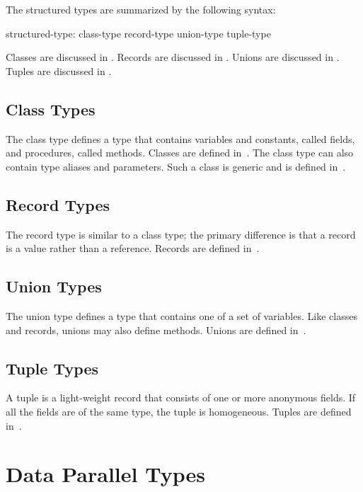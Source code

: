The structured types are summarized by the following syntax:

\begin{syntax}
structured-type:
  class-type
  record-type
  union-type
  tuple-type
\end{syntax}

Classes are discussed in .  Records are discussed
in .  Unions are discussed in .  Tuples are
discussed in .

\subsection{Class Types}

The class type defines a type that contains variables and constants,
called fields, and procedures, called methods.  Classes are defined
in~.  The class type can also contain type aliases and
parameters.  Such a class is generic and is defined
in~.

\subsection{Record Types}

The record type is similar to a class type; the primary difference is
that a record is a value rather than a reference.  Records are defined
in~.

\subsection{Union Types}

The union type defines a type that contains one of a set of variables.
Like classes and records, unions may also define methods.  Unions are
defined in~.

\subsection{Tuple Types}

A tuple is a light-weight record that consists of one or more
anonymous fields.  If all the fields are of the same type, the tuple
is homogeneous.  Tuples are defined in~.

\section{Data Parallel Types}
\label{Data_Parallel_Types}


